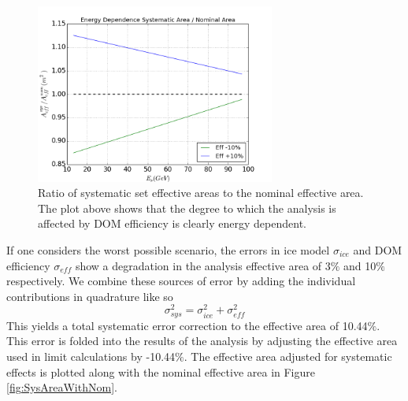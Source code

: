\documentclass{gatech-thesis}
\begin{document}
\begin{figure}[ht]
  \begin{center}
    \includegraphics[width=0.7\textwidth,keepaspectratio]{GENIE_EffectiveAreaRatioTrend_DomEff.png}
  \end{center}
  \caption{Ratio of systematic set effective areas to the nominal effective area. The plot above shows that the degree to which the analysis is affected by DOM efficiency is clearly energy dependent.}
  \label{fig:DOMEffEnergyTrend}
\end{figure}

If one considers the worst possible scenario, the errors in ice model $\sigma_{ice}$ and DOM efficiency $\sigma_{eff}$ show a degradation in the analysis effective area of 3$\%$ and 10$\%$ respectively. We combine these sources of error by adding the individual contributions in quadrature like so
\begin{equation}\label{eq:syserror}
\sigma_{sys}^2 = \sigma_{ice}^2 + \sigma_{eff}^2
\end{equation} 
This yields a total systematic error correction to the effective area of 10.44$\%$. This error is folded into the results of the analysis by adjusting the effective area used in limit calculations by -10.44$\%$. The effective area adjusted for systematic effects is plotted along with the nominal effective area in Figure \ref{fig:SysAreaWithNom}.
\end{document}
